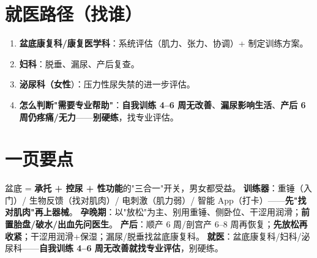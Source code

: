 \section{就医路径（找谁）}
\begin{enumerate}[leftmargin=2em,itemsep=0.3em]
  \item \textbf{盆底康复科/康复医学科}：系统评估（肌力、张力、协调）+ 制定训练方案。
  \item \textbf{妇科}：脱垂、漏尿、产后复查。
  \item \textbf{泌尿科（女性}）：压力性尿失禁的进一步评估。
  \item \textbf{怎么判断"需要专业帮助"}：\textbf{自我训练 4--6 周无改善}、\textbf{漏尿影响生活}、\textbf{产后 6 周仍疼痛/无力}——\textbf{别硬练}，找专业评估。
\end{enumerate}

\section{一页要点}
盆底 = \textbf{承托 + 控尿 + 性功能}的"三合一"开关，男女都受益。
\textbf{训练器}：重锤（入门）/ 生物反馈（找对肌肉）/ 电刺激（肌力弱）/ 智能 App（打卡）——\textbf{先"找对肌肉"再上器械}。
\textbf{孕晚期}：以"放松"为主、别用重锤、侧卧位、干涩用润滑；\textbf{前置胎盘/破水/出血先问医生}。
\textbf{产后}：顺产 6 周/剖宫产 6--8 周再恢复；\textbf{先放松再收紧}；干涩用润滑+保湿；漏尿/脱垂找盆底康复科。
\textbf{就医}：盆底康复科/妇科/泌尿科——\textbf{自我训练 4--6 周无改善就找专业评估}，别硬练。
